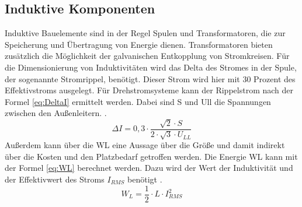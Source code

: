 		\subsection{Induktive Komponenten}
		Induktive Bauelemente sind in der Regel Spulen und Transformatoren, die zur Speicherung und Übertragung von Energie dienen. Transformatoren bieten zusätzlich die Möglichkeit der galvanischen Entkopplung von Stromkreisen. 
		Für die Dimensionierung von Induktivitäten wird das Delta des Stromes in der Spule, der sogenannte Stromrippel, benötigt. Dieser Strom wird hier mit 30 Prozent des Effektivstroms ausgelegt. Für Drehstromsysteme kann der Rippelstrom nach der Formel \ref{eq:DeltaI} ermittelt werden. Dabei sind \gls{S} und \gls{Ull} die Spannungen zwischen den Außenleitern. \cite{Boge.2007}.\\
		\begin{equation}
			\label{eq:DeltaI}
			\Delta I = 0,3 \cdot \dfrac{\sqrt{2} \cdot S}{2 \cdot \sqrt{3} \cdot U_{LL}}
		\end{equation}
		Außerdem kann über die \gls{WL} eine Aussage über die Größe und damit indirekt über die Kosten und den Platzbedarf getroffen werden. Die Energie \gls{WL} kann mit der Formel \ref{eq:WL} berechnet werden. Dazu wird der Wert der Induktivität und der Effektivwert des Stroms $I_{RMS}$ benötigt \cite{Boge.2007}.
		\begin{equation}
			\label{eq:WL}
			W_{L} =\dfrac{1}{2}\cdot L\cdot I_{RMS}^{2}
		\end{equation}
				
			
